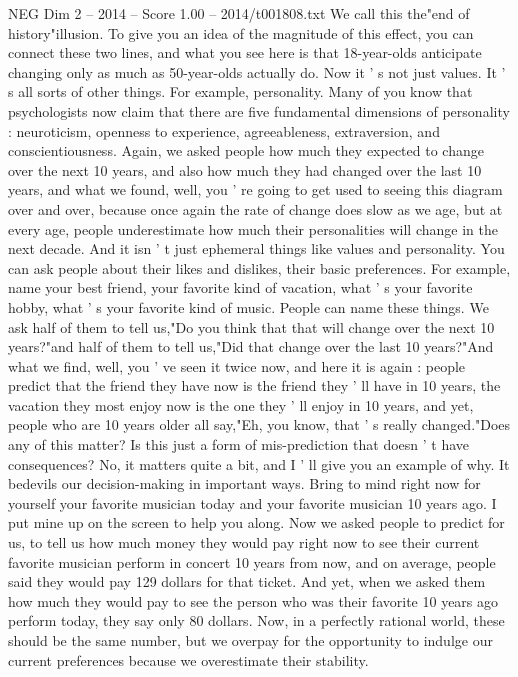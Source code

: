 \begin{textsample}{NEG Dim 2 – 2014 – Score 1.00 – 2014/t001808.txt}
We call this the"end of history"illusion.
To give you an idea of the magnitude of this effect, you can connect these two lines, and what you see here is that 18-year-olds anticipate changing only as much as 50-year-olds actually do.
Now it ' s not just values.
It ' s all sorts of other things.
For example, personality.
Many of you know that psychologists now claim that there are five fundamental dimensions of personality : neuroticism, openness to experience, agreeableness, extraversion, and conscientiousness.
Again, we asked people how much they expected to change over the next 10 years, and also how much they had changed over the last 10 years, and what we found, well, you ' re going to get used to seeing this diagram over and over, because once again the rate of change does slow as we age, but at every age, people underestimate how much their personalities will change in the next decade.
And it isn ' t just ephemeral things like values and personality.
You can ask people about their likes and dislikes, their basic preferences.
For example, name your best friend, your favorite kind of vacation, what ' s your favorite hobby, what ' s your favorite kind of music.
People can name these things.
We ask half of them to tell us,"Do you think that that will change over the next 10 years?"and half of them to tell us,"Did that change over the last 10 years?"And what we find, well, you ' ve seen it twice now, and here it is again : people predict that the friend they have now is the friend they ' ll have in 10 years, the vacation they most enjoy now is the one they ' ll enjoy in 10 years, and yet, people who are 10 years older all say,"Eh, you know, that ' s really changed."Does any of this matter?
Is this just a form of mis-prediction that doesn ' t have consequences?
No, it matters quite a bit, and I ' ll give you an example of why.
It bedevils our decision-making in important ways.
Bring to mind right now for yourself your favorite musician today and your favorite musician 10 years ago.
I put mine up on the screen to help you along.
Now we asked people to predict for us, to tell us how much money they would pay right now to see their current favorite musician perform in concert 10 years from now, and on average, people said they would pay 129 dollars for that ticket.
And yet, when we asked them how much they would pay to see the person who was their favorite 10 years ago perform today, they say only 80 dollars.
Now, in a perfectly rational world, these should be the same number, but we overpay for the opportunity to indulge our current preferences because we overestimate their stability.

\end{textsample}
